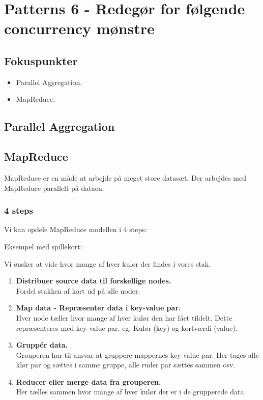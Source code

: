 \section{Patterns 6 - Redegør for følgende concurrency mønstre}

\subsection{Fokuspunkter}

\begin{itemize}
	\item Parallel Aggregation.
	\item MapReduce.
\end{itemize}

\subsection{Parallel Aggregation}

\subsection{MapReduce}
MapReduce er en måde at arbejde på meget store datasæt. Der arbejdes med MapReduce parallelt på dataen.

\subsubsection{4 steps}
Vi kan opdele MapReduce modellen i 4 steps:

Eksempel med spillekort:

Vi ønsker at vide hvor mange af hver kulør der findes i vores stak.
\begin{enumerate}
	\item \textbf{Distribuer source data til forskellige nodes.}\\
	Fordel stakken af kort ud på alle noder.
	\item \textbf{Map data - Repræsenter data i key-value par.}\\
	Hver node tæller hvor mange af hver kulør den har fået tildelt. Dette repræsenteres med key-value par. eg. Kulør (key) og kortværdi (value).
	\item \textbf{Gruppér data.} \\
	Grouperen har til ansvar at gruppere mappernes key-value par. Her tages alle klør par og sættes i samme gruppe, alle ruder par sættes sammen osv.
	\item \textbf{Reducer eller merge  data fra grouperen.}\\
	Her tælles sammen hvor mange af hver kulør der er i de grupperede data.
\end{enumerate}
